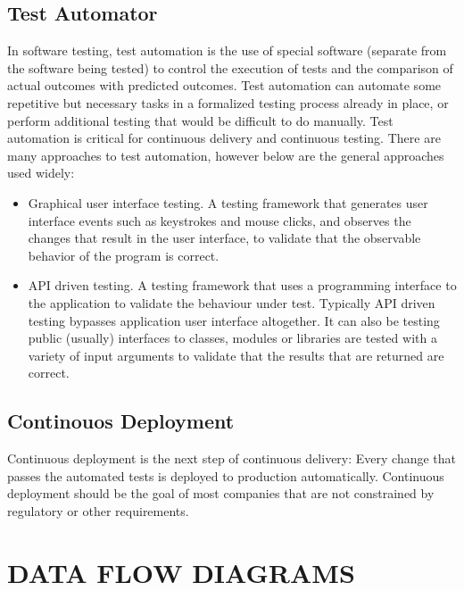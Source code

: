 \documentclass[12pt,a4paper,oneside]{report}
\begin{document}
{ 
\subsection{Test Automator}
\par In software testing, test automation is the use of special software (separate from the software being tested) to control the execution of tests and the comparison of actual outcomes with predicted outcomes. Test automation can automate some repetitive but necessary tasks in a formalized testing process already in place, or perform additional testing that would be difficult to do manually. Test automation is critical for continuous delivery and continuous testing. There are many approaches to test automation, however below are the general approaches used widely:

\begin{itemize}
\item Graphical user interface testing. A testing framework that generates user interface events such as keystrokes and mouse clicks, and observes the changes that result in the user interface, to validate that the observable behavior of the program is correct.
\item API driven testing. A testing framework that uses a programming interface to the application to validate the behaviour under test. Typically API driven testing bypasses application user interface altogether. It can also be testing public (usually) interfaces to classes, modules or libraries are tested with a variety of input arguments to validate that the results that are returned are correct.
\end{itemize}


\subsection{Continouos Deployment}
\par Continuous deployment is the next step of continuous delivery: Every change that passes the automated tests is deployed to production automatically. Continuous deployment should be the goal of most companies that are not constrained by regulatory or other requirements.


\newpage
\section{DATA FLOW DIAGRAMS}
}
\end{document}

